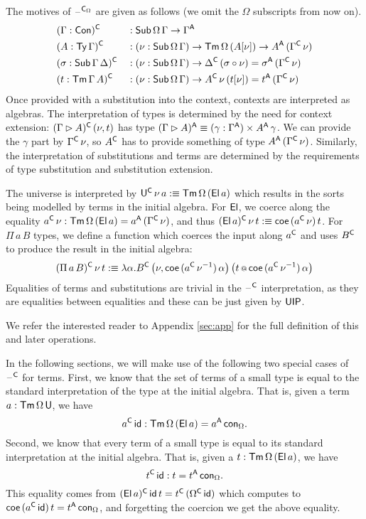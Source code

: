 \documentclass[acmsmall,screen]{acmart}
\begin{document}
The motives of $\mathord{\hspace{1pt}\text{--}\hspace{1pt}}^{\mathsf{C}_\Omega}$ are given as follows (we omit the
$\Omega$ subscripts from now on).
\begin{alignat*}{5}
  & (\Gamma:\mathsf{Con})^{\mathsf{C}} && : \mathsf{Sub}\,\Omega\,\Gamma\rightarrow\Gamma^{\mathsf{A}} \\
  & (A:\mathsf{Ty}\,\Gamma)^{\mathsf{C}} && : (\nu:\mathsf{Sub}\,\Omega\,\Gamma)\rightarrow\mathsf{Tm}\,\Omega\,(A[\nu])\rightarrow A^{\mathsf{A}}\,(\Gamma^{\mathsf{C}}\,\nu) \\
  & (\sigma:\mathsf{Sub}\,\Gamma\,\Delta)^{\mathsf{C}} && : (\nu:\mathsf{Sub}\,\Omega\,\Gamma)\rightarrow \Delta^{\mathsf{C}}\,(\sigma\circ\nu)=\sigma^{\mathsf{A}}\,(\Gamma^{\mathsf{C}}\,\nu) \\
  & (t:\mathsf{Tm}\,\Gamma\,A)^{\mathsf{C}} && : (\nu:\mathsf{Sub}\,\Omega\,\Gamma)\rightarrow A^{\mathsf{C}}\,\nu\,(t[\nu])=t^{\mathsf{A}}\,(\Gamma^{\mathsf{C}}\,\nu)
\end{alignat*}
Once provided with a substitution into the context, contexts are
interpreted as algebras. The interpretation of types is determined by
the need for context extension: $(\Gamma\rhd A)^{\mathsf{C}}\,(\nu,t)$ has type
$(\Gamma\rhd A)^{\mathsf{A}}\equiv(\gamma:\Gamma^{\mathsf{A}})\times A^{\mathsf{A}}\,\gamma$. We can
provide the $\gamma$ part by $\Gamma^{\mathsf{C}}\,\nu$, so $A^{\mathsf{C}}$ has to
provide something of type $A^{\mathsf{A}}\,(\Gamma^{\mathsf{C}}\,\nu)$. Similarly, the
interpretation of substitutions and terms are determined by the
requirements of type substitution and substitution extension.

The universe is interpreted by $\mathsf{U}^{\mathsf{C}}\,\nu\,a :\equiv
\mathsf{Tm}\,\Omega\,(\mathsf{El}\,a)$ which results in the sorts being modelled by
terms in the initial algebra. For $\mathsf{El}$, we coerce along the equality
$a^{\mathsf{C}}\,\nu : \mathsf{Tm}\,\Omega\,(\mathsf{El}\,a) = a^{\mathsf{A}}\,(\Gamma^{\mathsf{C}}\,\nu)$, and thus
$(\mathsf{El}\,a)^{\mathsf{C}}\,\nu\,t :\equiv \mathsf{coe}\,(a^{\mathsf{C}}\,\nu)\,t$. For $\Pi\,a\,B$
types, we define a function which coerces the input along $a^{\mathsf{C}}$ and
uses $B^{\mathsf{C}}$ to produce the result in the initial algebra:
\[
(\Pi\,a\,B)^{\mathsf{C}}\,\nu\,t :\equiv \lambda\alpha.B^{\mathsf{C}}\,\big(\nu,\mathsf{coe}\,({a^{\mathsf{C}}\,\nu^{-1}})\,\alpha\big)\,\big(t\mathop{{\scriptstyle @}} \mathsf{coe}\,({a^{\mathsf{C}}\,\nu^{-1}})\,\alpha\big)
\]
Equalities of terms and substitutions are trivial in the $\mathord{\hspace{1pt}\text{--}\hspace{1pt}}^{\mathsf{C}}$
interpretation, as they are equalities between equalities and these
can be just given by $\mathsf{UIP}$.

We refer the interested reader to Appendix \ref{sec:app} for the full
definition of this and later operations.

In the following sections, we will make use of the following two
special cases of $\mathord{\hspace{1pt}\text{--}\hspace{1pt}}^{\mathsf{C}}$ for terms. First, we know that the set of
terms of a small type is equal to the standard interpretation of the
type at the initial algebra. That is, given a term
$a:\mathsf{Tm}\,\Omega\,\mathsf{U}$, we have
\[
a^{\mathsf{C}}\,\mathsf{id} : \mathsf{Tm}\,\Omega\,(\mathsf{El}\,a) = a^{\mathsf{A}}\,\mathsf{con}_\Omega.
\]
Second, we know that every term of a small type is equal to its
standard interpretation at the initial algebra. That is, given a
$t:\mathsf{Tm}\,\Omega\,(\mathsf{El}\,a)$, we have
\[
t^{\mathsf{C}}\,\mathsf{id} : t = t^{\mathsf{A}}\,\mathsf{con}_\Omega.
\]
This equality comes from $(\mathsf{El}\,a)^{\mathsf{C}}\,\mathsf{id}\,t =
t^{\mathsf{C}}\,(\Omega^{\mathsf{C}}\,\mathsf{id})$ which computes to $\mathsf{coe}\,(a^{\mathsf{C}}\,\mathsf{id})\,t =
t^{\mathsf{A}}\,\mathsf{con}_\Omega$, and forgetting the coercion we get the above
equality.
\end{document}
